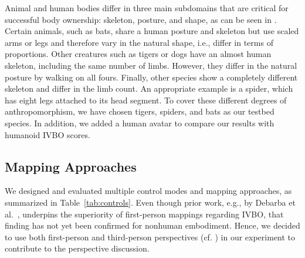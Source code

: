 Animal and human bodies differ in three main subdomains that are critical for successful body ownership: skeleton, posture, and shape, as can be seen in . Certain animals, such as bats, share a human posture and skeleton but use scaled arms or legs and therefore vary in the natural shape, i.e., differ in terms of proportions. Other creatures such as tigers or dogs have an almost human skeleton, including the same number of limbs. However, they differ in the natural posture by walking on all fours. Finally, other species show a completely different skeleton and differ in the limb count. An appropriate example is a spider, which has eight legs attached to its head segment. To cover these different degrees of anthropomorphism, we have chosen tigers, spiders, and bats as our testbed species. In addition, we added a human avatar to compare our results with humanoid IVBO scores.



%



\subsection{Mapping Approaches}

We designed and evaluated multiple control modes and mapping approaches, as summarized in Table~\ref{tab:controls}. Even though prior work, e.g., by Debarba et al.~, underpins the superiority of first-person mappings regarding IVBO, that finding has not yet been confirmed for nonhuman embodiment. Hence, we decided to use both first-person and third-person perspectives (cf. ) in our experiment to contribute to the perspective discussion.


